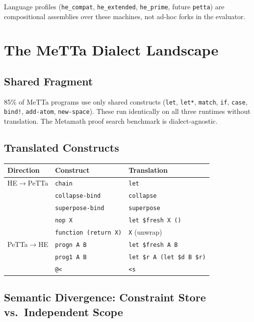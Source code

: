 \documentclass[11pt]{article}
\newcommand{\code}[1]{\texttt{#1}}
\newcommand{\PeTTa}{\textup{PeTTa}}
\newcommand{\HE}{\textup{HE}}
\begin{document}
Language profiles (\code{he\_compat}, \code{he\_extended},
\code{he\_prime}, future \code{petta}) are compositional assemblies
over these machines, not ad-hoc forks in the evaluator.

\section{The MeTTa Dialect Landscape}

\subsection{Shared Fragment}

85\% of MeTTa programs use only shared constructs (\code{let},
\code{let*}, \code{match}, \code{if}, \code{case}, \code{bind!},
\code{add-atom}, \code{new-space}).  These run identically on all three
runtimes without translation.  The Metamath proof search benchmark is
dialect-agnostic.

\subsection{Translated Constructs}

\begin{center}
\begin{tabular}{lll}
\toprule
Direction & Construct & Translation \\
\midrule
\HE{}$\to$\PeTTa{} & \code{chain} & \code{let} \\
& \code{collapse-bind} & \code{collapse} \\
& \code{superpose-bind} & \code{superpose} \\
& \code{nop X} & \code{let \$fresh X ()} \\
& \code{function (return X)} & \code{X} (unwrap) \\
\PeTTa{}$\to$\HE{} & \code{progn A B} & \code{let \$fresh A B} \\
& \code{prog1 A B} & \code{let \$r A (let \$d B \$r)} \\
& \code{@<} & \code{<s} \\
\bottomrule
\end{tabular}
\end{center}

\subsection{Semantic Divergence: Constraint Store vs.\ Independent Scope}
\end{document}
